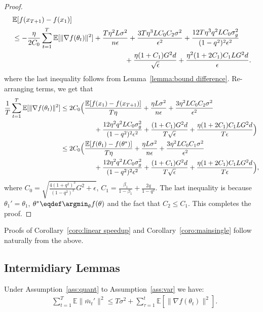\documentclass[11pt]{article}
\begin{document}
\begin{proof}
\begin{align*}
    &\mathbb E[f(x_{T+1})-f(x_1)]\\
    &\leq -\frac{\eta}{2C_0}\sum_{t=1}^T\mathbb E[\|\nabla f(\theta_t)\|^2]+\frac{T\eta^2 L \sigma^2}{n\epsilon}+\frac{3T\eta^3 LC_0C_2\sigma^2}{\epsilon^2}+\frac{12T\eta^3q^2LC_0\sigma_g^2}{(1-q^2)^2\epsilon^2}  \\
    &\hspace{2.2in} + \frac{\eta (1+C_1)G^2d}{\sqrt\epsilon}+\frac{\eta^2 (1+2C_1)C_1LG^2d}{\epsilon}.
\end{align*}
where the last inequality follows from Lemma~\ref{lemma:bound difference}. Re-arranging terms, we get that
\begin{align*}
    \frac{1}{T}\sum_{t=1}^T \mathbb E[\|\nabla f(\theta_t)\|^2]&\leq 2C_0\Big(\frac{\mathbb E[f(x_1)-f(x_{T+1})]}{T\eta}+\frac{\eta L \sigma^2}{n\epsilon}+\frac{3\eta^2 LC_0C_2\sigma^2}{\epsilon^2}  \\
    &\hspace{0.7in} + \frac{12\eta^2q^2LC_0\sigma_g^2}{(1-q^2)^2\epsilon^2}+\frac{ (1+C_1)G^2d}{T\sqrt\epsilon}+\frac{\eta (1+2C_1)C_1LG^2d}{T\epsilon} \Big)\\
    &\leq 2C_0\Big(\frac{\mathbb E[f(\theta_1)-f(\theta^*)]}{T\eta}+\frac{\eta L \sigma^2}{n\epsilon}+\frac{3\eta^2 LC_0C_1\sigma^2}{\epsilon^2}  \\
    &\hspace{0.7in} + \frac{12\eta^2q^2LC_0\sigma_g^2}{(1-q^2)^2\epsilon^2}+\frac{ (1+C_1)G^2d}{T\sqrt\epsilon}+\frac{\eta (1+2C_1)C_1LG^2d}{T\epsilon} \Big),
\end{align*}
where $C_0=\sqrt{\frac{4(1+q^2)^3}{(1-q^2)^2}G^2+\epsilon}$, $C_1=\frac{\beta_1}{1-\beta_1}+\frac{2q}{1-q^2}$. The last inequality is because $\theta_1'=\theta_1$, $\theta^* \eqdef \argmin_\theta f(\theta)$ and the fact that $C_2\leq C_1$. This completes the proof.
\end{proof}

Proofs of Corollary~\ref{coro:linear speedup} and Corollary~\ref{coro:mainsingle} follow naturally from the above.


\subsection{Intermidiary Lemmas}\label{app:lemmas}

\begin{Lemma} \label{lemma:m_t,m_t'}
Under Assumption~\ref{ass:quant} to Assumption~\ref{ass:var} we have:
\begin{align*}
    &\sum_{t=1}^T\mathbb E\|\bar m_t'\|^2\leq T\sigma^2+\sum_{\tau=1}^t \mathbb E[\|\nabla f(\theta_t)\|^2].
\end{align*}
\end{Lemma}
\end{document}
